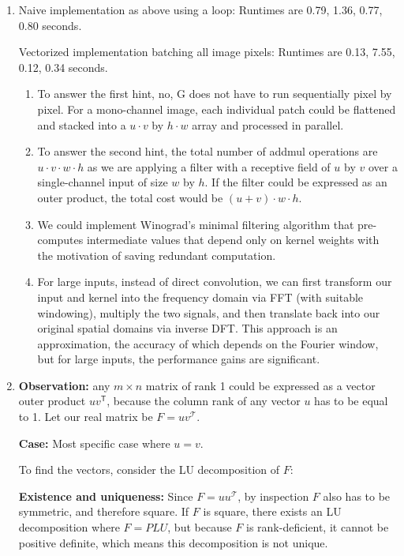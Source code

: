 \documentclass{article}
\begin{document}
\begin{enumerate}[label=(\roman*)]
\item %
Naive implementation as above using a loop: Runtimes are 0.79, 1.36, 0.77, 0.80 seconds.

Vectorized implementation batching all image pixels: Runtimes are 0.13, 7.55, 0.12, 0.34 seconds.

\begin{enumerate}
\item To answer the first hint, no, G does not have to run sequentially pixel by pixel. For a mono-channel image, each individual patch could be flattened and stacked into a $u\cdot v$ by $h\cdot w$ array and processed in parallel.

\item To answer the second hint, the total number of addmul operations are $u \cdot v \cdot w \cdot h$ as we are applying a filter with a receptive field of $u$ by $v$ over a single-channel input of size $w$ by $h$. If the filter could be expressed as an outer product, the total cost would be $(u+v) \cdot w \cdot h$.

\item We could implement Winograd's minimal filtering algorithm that pre-computes intermediate values that depend only on kernel weights with the motivation of saving redundant computation.

\item For large inputs, instead of direct convolution, we can first transform our input and kernel into the frequency domain via FFT (with suitable windowing), multiply the two signals, and then translate back into our original spatial domains via inverse DFT. This approach is an approximation, the accuracy of which depends on the Fourier window, but for large inputs, the performance gains are significant.
\end{enumerate}

\item %
\textbf{Observation:} any $m\times n$ matrix of rank 1 could be expressed as a vector outer product $uv^\mathsf{T}$, because the column rank of any vector $u$ has to be equal to 1. Let our real matrix be $F = uv^\mathcal{T}$.

\textbf{Case:} Most specific case where $u = v$.

To find the vectors, consider the LU decomposition of $F$:

\textbf{Existence and uniqueness:} Since $F=uu^\mathcal{T}$, by inspection $F$ also has to be symmetric, and therefore square. If $F$ is square, there exists an LU decomposition where $F=PLU$, but because $F$ is rank-deficient, it cannot be positive definite, which means this decomposition is not unique.


\end{enumerate}
\end{document}
